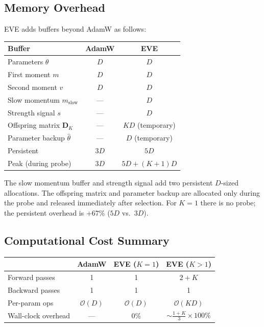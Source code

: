 \documentclass[12pt]{article}
\begin{document}
\subsection{Memory Overhead}

EVE adds buffers beyond AdamW as follows:

\medskip
\begin{center}
\small
\begin{tabular}{@{}lcc@{}}
  \toprule
  Buffer & AdamW & EVE \\
  \midrule
  Parameters $\theta$ & $D$ & $D$ \\
  First moment $m$ & $D$ & $D$ \\
  Second moment $v$ & $D$ & $D$ \\
  Slow momentum $m_{\mathrm{slow}}$ & --- & $D$ \\
  Strength signal $s$ & --- & $D$ \\
  Offspring matrix $\mathbf{D}_K$ & --- & $KD$ (temporary) \\
  Parameter backup $\hat{\theta}$ & --- & $D$ (temporary) \\
  \midrule
  Persistent & $3D$ & $5D$ \\
  Peak (during probe) & $3D$ & $5D + (K+1)D$ \\
  \bottomrule
\end{tabular}
\end{center}

\medskip
The slow momentum buffer and strength signal add two persistent
$D$-sized allocations.
The offspring matrix and parameter backup are allocated only during the
probe and released immediately after selection.
For $K = 1$ there is no probe; the persistent overhead is
$+67\%$ ($5D$ vs.\ $3D$).

\subsection{Computational Cost Summary}

\begin{center}
\small
\begin{tabular}{@{}lccc@{}}
  \toprule
  & AdamW & EVE ($K = 1$) & EVE ($K > 1$) \\
  \midrule
  Forward passes & 1 & 1 & $2 + K$ \\
  Backward passes & 1 & 1 & 1 \\
  Per-param ops & $\mathcal{O}(D)$ & $\mathcal{O}(D)$
    & $\mathcal{O}(KD)$ \\
  Wall-clock overhead & --- & 0\% & $\sim\!\frac{1+K}{3}\times 100\%$ \\
  \bottomrule
\end{tabular}
\end{center}
\end{document}
